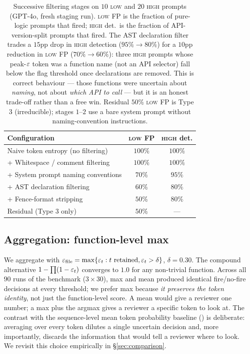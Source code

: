 \begin{table}[h]
\centering
\small
\begin{tabular}{lcc}
\toprule
\textbf{Configuration} & \textbf{\textsc{low} FP} & \textbf{\textsc{high} det.} \\
\midrule
Naive token entropy (no filtering)                & $100\%$ & $100\%$ \\
+ Whitespace / comment filtering                  & $100\%$ & $100\%$ \\
+ System prompt naming conventions                &  $70\%$ &  $95\%$ \\
+ AST declaration filtering                       &  $60\%$ &  $80\%$ \\
+ Fence-format stripping                          &  $50\%$ &  $80\%$ \\
\midrule
Residual (Type 3 only)                            &  $50\%$ & --- \\
\bottomrule
\end{tabular}
\caption{Successive filtering stages on $10$ \textsc{low} and $20$
\textsc{high} prompts (GPT-4o, fresh staging run). \textsc{low} FP
is the fraction of pure-logic prompts that fired; \textsc{high} det.\
is the fraction of API-version-split prompts that fired. The AST
declaration filter trades a $15$pp drop in \textsc{high} detection
($95\%\to80\%$) for a $10$pp reduction in \textsc{low} FP
($70\%\to60\%$): three \textsc{high} prompts whose peak-$\varepsilon$ token
was a function name (not an API selector) fall below the flag threshold
once declarations are removed. This is correct behaviour --- those
functions were uncertain about \emph{naming}, not about \emph{which
API to call} --- but it is an honest trade-off rather than a free win.
Residual $50\%$ \textsc{low} FP is Type 3 (irreducible); stages
$1$--$2$ use a bare system prompt without naming-convention
instructions.}
\label{tab:filtering}
\end{table}

\subsection{Aggregation: function-level max}
\label{subsec:aggregation}

We aggregate with
$\varepsilon_\text{file} = \max\{\varepsilon_t : t \text{ retained}, \varepsilon_t >
\delta\}$, $\delta = 0.30$. The compound alternative $1 - \prod(1 -
\varepsilon_t)$ converges to $1.0$ for any non-trivial function. Across all
$90$ runs of the benchmark ($3 \times 30$), max and mean produced
identical fire/no-fire decisions at every threshold; we prefer max
because \emph{it preserves the token identity}, not just the
function-level score. A mean would give a reviewer one number; a
max plus the argmax gives a reviewer a specific token to look at.
The contrast with the sequence-level mean token probability baseline
(\papg) is deliberate: averaging over every token dilutes a single
uncertain decision and, more importantly, discards the information
that would tell a reviewer where to look. We revisit this choice
empirically in \S\ref{sec:comparison}.

